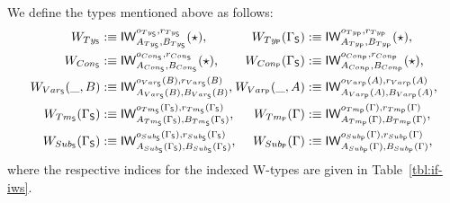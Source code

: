 \begin{defn}
We define the types mentioned above as follows:
\begin{align*}
\begin{split}
W_{Ty_{\mathsf{S}}}
  &:\equiv \mathsf{IW}_{A_{Ty_{\mathsf{S}}}, B_{Ty_{\mathsf{S}}}}^{o_{Ty_{\mathsf{S}}},r_{Ty_{\mathsf{S}}}}(\star) \text{,} \\
W_{Con_{\mathsf{S}}}
  &:\equiv \mathsf{IW}_{A_{Con_{\mathsf{S}}}, B_{Con_{\mathsf{S}}}}^{o_{Con_{\mathsf{S}}},r_{Con_{\mathsf{S}}}}(\star) \text{,} \\
W_{Var_{\mathsf{S}}}(\_, B)
  &:\equiv \mathsf{IW}_{A_{Var_{\mathsf{S}}}(B), B_{Var_{\mathsf{S}}}(B)}^{o_{Var_{\mathsf{S}}}(B),r_{Var_{\mathsf{S}}}(B)} \text{,} \\
W_{Tm_{\mathsf{S}}}(\Gamma_{\mathsf{S}})
  &:\equiv \mathsf{IW}_{A_{Tm_{\mathsf{S}}}(\Gamma_{\mathsf{S}}), B_{Tm_{\mathsf{S}}}(\Gamma_{\mathsf{S}})}^{o_{Tm_{\mathsf{S}}}(\Gamma_{\mathsf{S}}),r_{Tm_{\mathsf{S}}}(\Gamma_{\mathsf{S}})} \text{,} \\
W_{Sub_{\mathsf{S}}}(\Gamma_{\mathsf{S}})
  &:\equiv \mathsf{IW}_{A_{Sub_{\mathsf{S}}}(\Gamma_{\mathsf{S}}), B_{Sub_{\mathsf{S}}}(\Gamma_{\mathsf{S}})}^{o_{Sub_{\mathsf{S}}}(\Gamma_{\mathsf{S}}),r_{Sub_{\mathsf{S}}}(\Gamma_{\mathsf{S}})} \text{,}
\end{split}
\begin{split}
W_{Ty_{\mathsf{P}}}(\Gamma_{\mathsf{S}})
  &:\equiv \mathsf{IW}_{A_{Ty_{\mathsf{P}}}, B_{Ty_{\mathsf{P}}}}^{o_{Ty_{\mathsf{P}}},r_{Ty_{\mathsf{P}}}}(\star) \text{,} \\
W_{Con_{\mathsf{P}}}(\Gamma_{\mathsf{S}})
  &:\equiv \mathsf{IW}_{A_{Con_{\mathsf{P}}}, B_{Con_{\mathsf{P}}}}^{o_{Con_{\mathsf{P}}},r_{Con_{\mathsf{P}}}}(\star) \text{,} \\
W_{Var_{\mathsf{P}}}(\_, A)
  &:\equiv \mathsf{IW}_{A_{Var_{\mathsf{P}}}(A), B_{Var_{\mathsf{P}}}(A)}^{o_{Var_{\mathsf{P}}}(A),r_{Var_{\mathsf{P}}}(A)} \text{,} \\
W_{Tm_{\mathsf{P}}}(\Gamma)
  &:\equiv \mathsf{IW}_{A_{Tm_{\mathsf{P}}}(\Gamma), B_{Tm_{\mathsf{P}}}(\Gamma)}^{o_{Tm_{\mathsf{P}}}(\Gamma),r_{Tm_{\mathsf{P}}}(\Gamma)} \text{,} \\
W_{Sub_{\mathsf{P}}}(\Gamma)
  &:\equiv \mathsf{IW}_{A_{Sub_{\mathsf{P}}}(\Gamma), B_{Sub_{\mathsf{P}}}(\Gamma)}^{o_{Sub_{\mathsf{P}}}(\Gamma),r_{Sub_{\mathsf{P}}}(\Gamma)} \text{,}
\end{split}
\end{align*}
where the respective indices for the indexed W-types are given in Table~\ref{tbl:if-iws}.
\end{defn}

